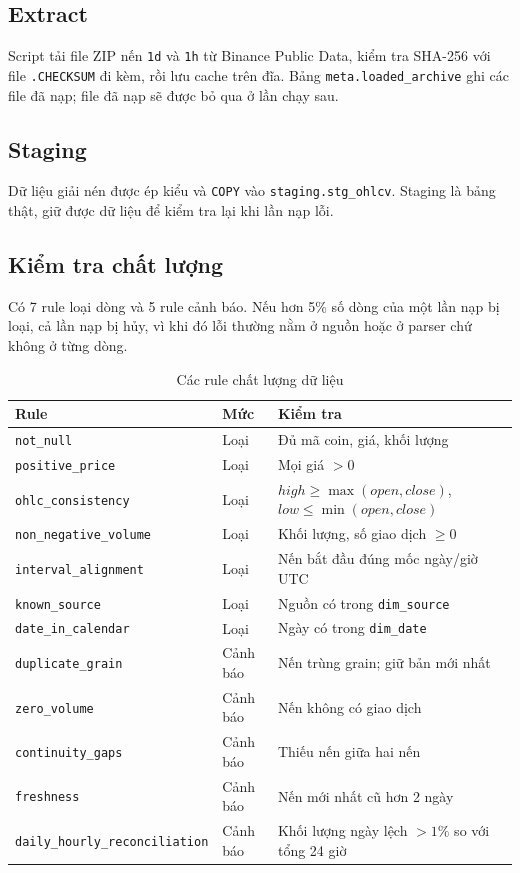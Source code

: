 \documentclass[11pt,a4paper]{article}
\newcommand{\code}[1]{\texttt{#1}}
\begin{document}
\subsection{Extract}
Script tải file ZIP nến \code{1d} và \code{1h} từ Binance Public Data, kiểm tra SHA-256 với file
\code{.CHECKSUM} đi kèm, rồi lưu cache trên đĩa. Bảng \code{meta.loaded\_archive} ghi các file
đã nạp; file đã nạp sẽ được bỏ qua ở lần chạy sau.

\subsection{Staging}
Dữ liệu giải nén được ép kiểu và \code{COPY} vào \code{staging.stg\_ohlcv}. Staging là bảng thật,
giữ được dữ liệu để kiểm tra lại khi lần nạp lỗi.

\subsection{Kiểm tra chất lượng}
Có 7 rule loại dòng và 5 rule cảnh báo. Nếu hơn 5\% số dòng của một lần nạp bị loại,
cả lần nạp bị hủy, vì khi đó lỗi thường nằm ở nguồn hoặc ở parser chứ không ở từng dòng.

\begin{table}[H]
\centering\small
\begin{tabularx}{\linewidth}{llX}
\toprule
\textbf{Rule} & \textbf{Mức} & \textbf{Kiểm tra} \\
\midrule
\code{not\_null} & Loại & Đủ mã coin, giá, khối lượng \\
\code{positive\_price} & Loại & Mọi giá $> 0$ \\
\code{ohlc\_consistency} & Loại & $high \ge \max(open, close)$, $low \le \min(open, close)$ \\
\code{non\_negative\_volume} & Loại & Khối lượng, số giao dịch $\ge 0$ \\
\code{interval\_alignment} & Loại & Nến bắt đầu đúng mốc ngày/giờ UTC \\
\code{known\_source} & Loại & Nguồn có trong \code{dim\_source} \\
\code{date\_in\_calendar} & Loại & Ngày có trong \code{dim\_date} \\
\midrule
\code{duplicate\_grain} & Cảnh báo & Nến trùng grain; giữ bản mới nhất \\
\code{zero\_volume} & Cảnh báo & Nến không có giao dịch \\
\code{continuity\_gaps} & Cảnh báo & Thiếu nến giữa hai nến \\
\code{freshness} & Cảnh báo & Nến mới nhất cũ hơn 2 ngày \\
\code{daily\_hourly\_reconciliation} & Cảnh báo & Khối lượng ngày lệch $>1\%$ so với tổng 24 giờ \\
\bottomrule
\end{tabularx}
\caption{Các rule chất lượng dữ liệu}
\end{table}
\end{document}
